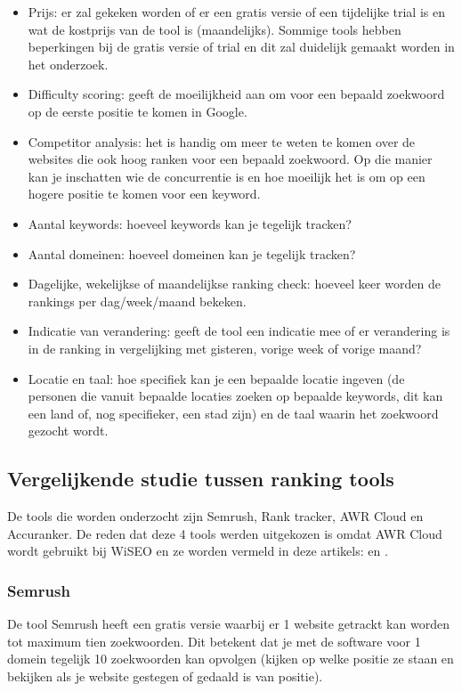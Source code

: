 \begin{itemize}
\item Prijs: er zal gekeken worden of er een gratis versie of een tijdelijke trial is en wat de kostprijs van de tool is (maandelijks). Sommige tools hebben beperkingen bij de gratis versie of trial en dit zal duidelijk gemaakt worden in het onderzoek. 
\item Difficulty scoring: geeft de moeilijkheid aan om voor een bepaald zoekwoord op de eerste positie te komen in Google.
\item Competitor analysis: het is handig om meer te weten te komen over de websites die ook hoog ranken voor een bepaald zoekwoord. Op die manier kan je inschatten wie de concurrentie is en hoe moeilijk het is om op een hogere positie te komen voor een keyword.
\item Aantal keywords: hoeveel keywords kan je tegelijk tracken? 
\item Aantal domeinen: hoeveel domeinen kan je tegelijk tracken? 
\item Dagelijke, wekelijkse of maandelijkse ranking check: hoeveel keer worden de rankings per dag/week/maand bekeken. 
\item Indicatie van verandering: geeft de tool een indicatie mee of er verandering is in de ranking in vergelijking met gisteren, vorige week of vorige maand?
\item Locatie en taal: hoe specifiek kan je een bepaalde locatie ingeven (de personen die vanuit bepaalde locaties zoeken op bepaalde keywords, dit kan een land of, nog specifieker, een stad zijn) en de taal waarin het zoekwoord gezocht wordt.  
\end{itemize}

\subsection{Vergelijkende studie tussen ranking tools}
\label{ch: Vergelijkende studie tussen ranking tools}

De tools die worden onderzocht zijn Semrush, Rank tracker, AWR Cloud en Accuranker. De reden dat deze 4 tools werden uitgekozen is omdat AWR Cloud wordt gebruikt bij WiSEO en ze worden vermeld in deze artikels: \textcite{SEO13} en \textcite{SEOCOMPLETE}.  

\subsubsection{Semrush}
\label{ch: Semrush}
De tool Semrush heeft een gratis versie waarbij er 1 website getrackt kan worden tot maximum tien zoekwoorden. Dit betekent dat je met de software voor 1 domein tegelijk 10 zoekwoorden kan opvolgen (kijken op welke positie ze staan en bekijken als je website gestegen of gedaald is van positie). 

